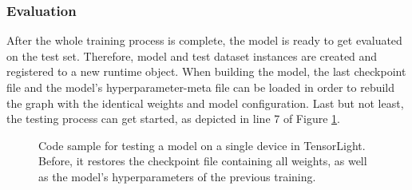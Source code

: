 \subsubsection*{Evaluation}

After the whole training process is complete, the model is ready to get evaluated on the test set. Therefore, model and test dataset instances are created and registered to a new runtime object. When building the model, the last checkpoint file and the model's hyperparameter-meta file can be loaded in order to rebuild the graph with the identical weights and model configuration. Last but not least, the testing process can get started, as depicted in line 7 of Figure \ref{code:runtime_eval}.

\begin{figure}[htpb]
  
  \caption[Code: Evaluation with TensorLight]{Code sample for testing a model on a single device in TensorLight. Before, it restores the checkpoint file containing all weights, as well as the model's hyperparameters of the previous training.}\label{code:runtime_eval}
\end{figure}
\fi